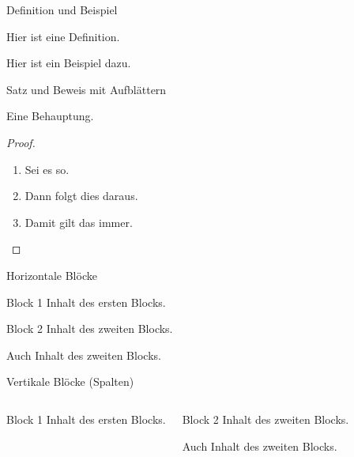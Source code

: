 	\begin{frame}{Definition und Beispiel}
		\begin{definition}
			Hier ist eine Definition.
		\end{definition}
		\begin{example}
			Hier ist ein Beispiel dazu.
		\end{example}
	\end{frame}


	\begin{frame}{Satz und Beweis mit Aufblättern}
		\begin{theorem}
			Eine Behauptung.
		\end{theorem}
		\begin{proof}
			\begin{enumerate}
				\item<1-> Sei es so.
				\item<2-> Dann folgt dies daraus.
				\item<1-> Damit gilt das immer.\qedhere
			\end{enumerate}
		\end{proof}
	\end{frame}


	\begin{frame}{Horizontale Blöcke}
		\begin{block}{Block 1}
			Inhalt des ersten Blocks.
		\end{block}
		\begin{block}{Block 2}
			Inhalt des zweiten Blocks.

			Auch Inhalt des zweiten Blocks.
		\end{block}
	\end{frame}


	\begin{frame}{Vertikale Blöcke (Spalten)}
		\begin{columns}
				\begin{block}{Block 1}
					Inhalt des ersten Blocks.
				\end{block}
				\begin{block}{Block 2}
					Inhalt des zweiten Blocks.

					Auch Inhalt des zweiten Blocks.
				\end{block}
		\end{columns}
	\end{frame}


